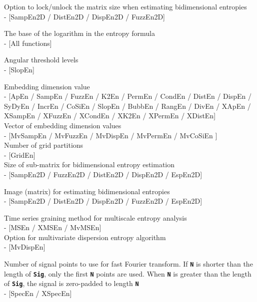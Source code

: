 \documentclass[12pt, a4paper, titlepage, openany]{book}
\begin{document}
\begin{description}[labelsep=1cm, labelwidth=2cm, nosep, style=multiline,leftmargin=3cm]
\item[\texttt{Lock}]		 Option to lock/unlock the matrix size when estimating bidimensional entropies \\ - [SampEn2D / DistEn2D / DispEn2D / FuzzEn2D]\\
\item[\texttt{Logx}]		 The base of the logarithm in the entropy formula  \\ - [All functions]\\
\item[\texttt{Lvls}]		 Angular threshold levels \\ - [SlopEn]\\
\item[\texttt{m}]		 Embedding dimension value \\ - [ApEn / SampEn / FuzzEn / K2En / PermEn / CondEn / DistEn / DispEn / SyDyEn / IncrEn / CoSiEn / SlopEn / BubbEn / RangEn / DivEn / XApEn / XSampEn / XFuzzEn / XCondEn / XK2En / XPermEn / XDistEn] \\
Vector of embedding dimension values \\ - [MvSampEn / MvFuzzEn / MvDispEn / MvPermEn / MvCoSiEn ]\\
Number of grid partitions \\ - [GridEn]\\
Size of sub-matrix for bidimensional entropy estimation \\ - [SampEn2D / FuzzEn2D / DistEn2D / DispEn2D / EspEn2D]\\
\item[\texttt{Mat}]		Image (matrix) for estimating bidimensional entropies \\ - [SampEn2D / DistEn2D / DispEn2D / FuzzEn2D / EspEn2D]\\
\item[\texttt{Methodx}]		Time series graining method for multiscale entropy analysis \\ - [MSEn / XMSEn / MvMSEn]\\
Option for multivariate dispersion entropy algorithm \\
- [MvDispEn]\\
\item[\texttt{N}]		Number of signal points to use for fast Fourier transform. If \texttt{\textbf{N}} is shorter than the length of \texttt{\textbf{Sig}}, only the first \texttt{\textbf{N}} points are used. When \texttt{\textbf{N}} is greater than the length of \texttt{\textbf{Sig}}, the signal is zero-padded to length \texttt{\textbf{N}} \\ - [SpecEn / XSpecEn]\\

\end{description}
\end{document}
